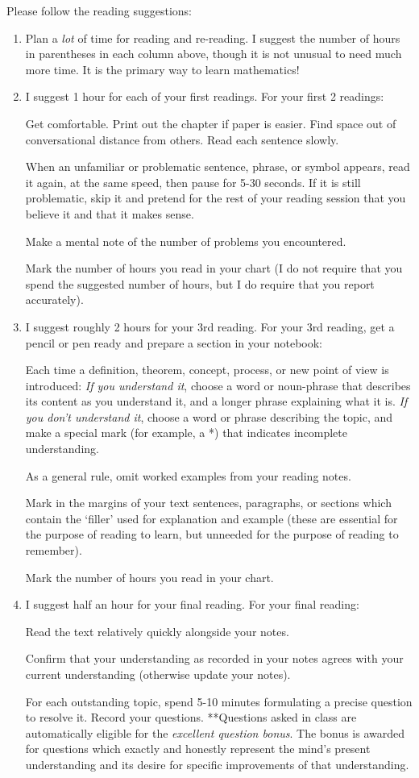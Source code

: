 \documentclass[12pt]{article}
\begin{document}
Please follow the reading suggestions:
\begin{enumerate}
\item{Plan a \emph{lot} of time for reading and re-reading.  I suggest the number of hours in parentheses in each column above, though it is not unusual to need much more time.  It is the primary way to learn mathematics!}
\item{I suggest 1 hour for each of your first readings.  For your first 2 readings: 

Get comfortable.  Print out the chapter if paper is easier.  Find space out of conversational distance from others.  Read each sentence slowly.

When an unfamiliar or problematic sentence, phrase, or symbol appears, read it again, at the same speed, then pause for 5-30 seconds.  If it is still problematic, skip it and pretend for the rest of your reading session that you believe it and that it makes sense.

Make a mental note of the number of problems you encountered.

Mark the number of hours you read in your chart (I do not require that you spend the suggested number of hours, but I do require that you report accurately).}
\item{I suggest roughly 2 hours for your 3rd reading.  For your 3rd reading, get a pencil or pen ready and prepare a section in your notebook:

Each time a definition, theorem, concept, process, or new point of view is introduced: \emph{If you understand it}, choose a word or noun-phrase that describes its content as you understand it, and a longer phrase explaining what it is.  \emph{If you don't understand it}, choose a word or phrase describing the topic, and make a special mark (for example, a *) that indicates incomplete understanding.

As a general rule, omit worked examples from your reading notes.

Mark in the margins of your text sentences, paragraphs, or sections which contain the `filler' used for explanation and example (these are essential for the purpose of reading to learn, but unneeded for the purpose of reading to remember).

Mark the number of hours you read in your chart.
}
\item{I suggest half an hour for your final reading.  For your final reading:

Read the text relatively quickly alongside your notes.

Confirm that your understanding as recorded in your notes agrees with your current understanding (otherwise update your notes).

For each outstanding topic, spend 5-10 minutes formulating a precise question to resolve it.  Record your questions.  **Questions asked in class are automatically eligible for the \emph{excellent question bonus}.  The bonus is awarded for questions which exactly and honestly represent the mind's present understanding and its desire for specific improvements of that understanding.
}
\end{enumerate}
\end{document}
